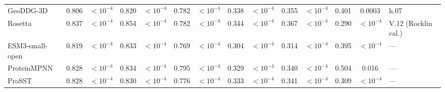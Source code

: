 \begin{table}[H]
{\begin{tabular}{lccccccccccccl}
GeoDDG-3D & 0.806 & $<10^{-4}$ & 0.820 & $<10^{-4}$ & 0.782 & $<10^{-4}$ & 0.338 & $<10^{-4}$ & 0.355 & $<10^{-4}$ & 0.401 & 0.0003 & h.07 \\
Rosetta & 0.837 & $<10^{-4}$ & 0.854 & $<10^{-4}$ & 0.782 & $<10^{-4}$ & 0.344 & $<10^{-4}$ & 0.367 & $<10^{-4}$ & 0.290 & $<10^{-4}$ & V.12 (Rocklin cal.) \\
ESM3-small-open & 0.819 & $<10^{-4}$ & 0.833 & $<10^{-4}$ & 0.769 & $<10^{-4}$ & 0.304 & $<10^{-4}$ & 0.314 & $<10^{-4}$ & 0.395 & $<10^{-4}$ & --- \\
ProteinMPNN & 0.828 & $<10^{-4}$ & 0.834 & $<10^{-4}$ & 0.795 & $<10^{-4}$ & 0.329 & $<10^{-4}$ & 0.340 & $<10^{-4}$ & 0.504 & 0.016 & --- \\
ProSST & 0.828 & $<10^{-4}$ & 0.830 & $<10^{-4}$ & 0.776 & $<10^{-4}$ & 0.333 & $<10^{-4}$ & 0.341 & $<10^{-4}$ & 0.309 & $<10^{-4}$ & --- \\
\bottomrule
\end{tabular}
}
\end{table}


